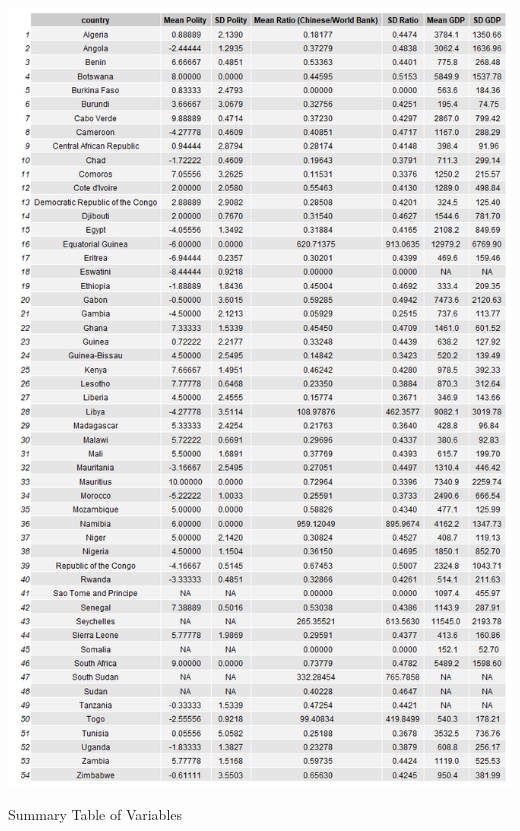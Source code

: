 \documentclass[12pt]{article}
\begin{document}
\begin{table}
    \centering
    \includegraphics[scale=0.53]{Figures/summary3.png}
    \caption{Summary Table of Variables}
\end{table}
\end{document}
